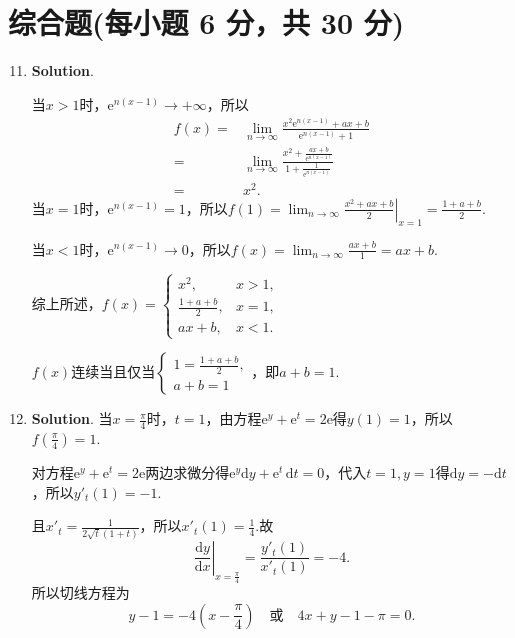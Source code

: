 \documentclass[../main.tex]{subfiles}
\begin{document}
\section{综合题(每小题 6 分，共 30 分)}
\begin{enumerate}
    \setcounter{enumi}{10}
    \item \textbf{Solution}.

          当$x>1$时，$\mathrm{e}^{n(x-1)}\to+\infty$，所以
          \[
              \begin{aligned}
                  f(x)= {} & \lim_{n\to\infty}\frac{x^2\mathrm{e}^{n(x-1)}+ax+b}{\mathrm{e}^{n(x-1)}+1}                    \\
                  = {}     & \lim_{n\to\infty}\frac{x^2+\frac{ax+b}{\mathrm{e}^{n(x-1)}}}{1+\frac{1}{\mathrm{e}^{n(x-1)}}} \\
                  = {}     & x^{2}.
              \end{aligned}
          \]
          当$x=1$时，$\mathrm{e}^{n(x-1)}=1$，所以$f(1)=\left.\lim_{n\to\infty}\frac{x^{2}+ax+b}{2}
              \right|_{x=1}=\frac{1+a+b}{2}$.

          当$x<1$时，$\mathrm{e}^{n(x-1)}\to0$，所以$f(x)=\lim_{n\to\infty}\frac{ax+b}{1}
              =ax+b$.

          综上所述，$f(x)=
              \begin{cases}
                  x^{2},           & x>1, \\
                  \frac{1+a+b}{2}, & x=1, \\
                  ax+b,            & x<1.
              \end{cases}$

          $f(x)$连续当且仅当$\begin{cases}
                  1=\frac{1+a+b}{2}, \\
                  a+b=1
              \end{cases}$，即$a+b=1$.

    \item \textbf{Solution}. 当$x=\frac{\pi}{4}$时，$t=1$，由方程$\mathrm{e}
              ^{y}+\mathrm{e}^{t}=2\mathrm{e}$得$y(1)=1$，所以$f\left(\frac{\pi}{4}\right
              )=1$.

          对方程$\mathrm{e}^{y}+\mathrm{e}^{t}=2\mathrm{e}$两边求微分得$\mathrm{e}^{y}
              \mathrm{d}y+\mathrm{e}^{t}\,\mathrm{d}t=0$，代入$t=1,y=1$得$\mathrm{d}y=-\mathrm{d}
              t$，所以$y'_{t}(1)=-1$.

          且$x'_{t}=\frac{1}{2\sqrt{t}(1+t)}$，所以$x'_{t}(1)=\frac{1}{4}$.故
          \[
              \left.\frac{\mathrm{d}y}{\mathrm{d}x}\right|_{x=\frac{\pi}{4}}=\frac{y'_{t}(1)}{x'_{t}(1)}
              =-4.
          \]
          所以切线方程为
          \[
              y-1=-4\left(x-\frac{\pi}{4}\right)\quad\text{或}\quad 4x+y-1-\pi=0.
          \]


\end{enumerate}
\end{document}
